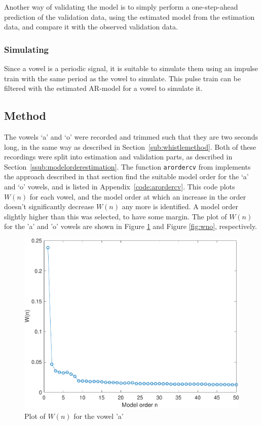\documentclass{IEEEtran}
\newcommand{\code}[1]{\texttt{#1}}
\begin{document}
Another way of validating the model is to simply perform a one-step-ahead
prediction of the validation data, using the estimated model from the
estimation data, and compare it with the observed validation data.

\subsubsection{Simulating}
Since a vowel is a periodic signal, it is suitable to simulate them using an
impulse train with the same period as the vowel to simulate. This pulse train
can be filtered with the estimated AR-model for a vowel to simulate it.

\subsection{Method}
The vowels `a' and `o' were recorded and trimmed such that they are two seconds
long, in the same way as described in Section~\ref{sub:whistlemethod}.
Both of these recordings were split into estimation and validation parts,
as described in Section~\ref{ssub:modelorderestimation}. The function 
\code{arordercv} from \cite{signalproc} implements the approach described in 
that section find the suitable model order for the `a' and `o' vowels, and is
listed in Appendix~\ref{code:arordercv}. This code plots $W(n)$ for each
vowel, and the model order at which an increase in the order doesn't
significantly decrease $W(n)$ any more is identified. A model order slightly
higher than this was selected, to have some margin. The plot of $W(n)$ for the
'a' and 'o' vowels are shown in Figure \ref{fig:wna} and Figure \ref{fig:wno},
respectively.

\begin{figure}[h!]
    \centering
    \captionsetup{justification=centering}
    \includegraphics[width=0.8\columnwidth]{pictures/wna.pdf}
    \caption{Plot of $W(n)$ for the vowel 'a'}
    \label{fig:wna}
\end{figure}
\end{document}
